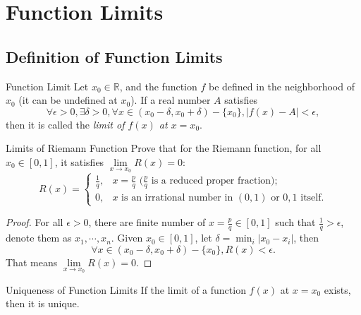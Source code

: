 
\section{Function Limits}

\subsection{Definition of Function Limits}

\begin{definition}{Function Limit}{}
  Let $x_0 \in \mathbb{R}$, and the function $f$ be defined in the neighborhood
  of $x_0$ (it can be undefined at $x_0$).
  If a real number $A$ satisfies
  \begin{equation}
    \forall \epsilon > 0, \exists \delta > 0, \forall x \in (x_0 - \delta, x_0 + \delta) - \{x_0\},
    |f(x) - A| < \epsilon,
  \end{equation}
  then it is called the \emph{limit of $f(x)$ at $x = x_0$}.
\end{definition}

\begin{example}{Limits of Riemann Function}{}
  Prove that for the Riemann function, for all $x_0 \in [0, 1]$,
  it satisfies $\lim \limits _{x \rightarrow x_0} R(x) = 0$:
  \begin{equation}
    R(x)= \begin{cases}
    \frac{1}{q}, & x = \frac{p}{q} \text{ ($\frac{p}{q}$ is a reduced proper fraction)}; \\
    0, & x \text{ is an irrational number in } (0,1) \text{ or } 0,1 \text{ itself}.
    \end{cases}
  \end{equation}
\end{example}

\begin{proof}
  For all $\epsilon > 0$, there are finite number of $x = \frac{p}{q} \in [0,
  1]$ such that $\frac{1}{q} > \epsilon$,
  denote them as $x_1,\cdots,x_n$.
  Given $x_0 \in [0, 1]$, let $\delta = \min_i |x_0 - x_i|$,
  then
  \begin{equation}
    \forall x \in (x_0 - \delta, x_0 + \delta) - \{x_0\},
    R(x) < \epsilon.
  \end{equation}
  That means $\lim \limits _{x \rightarrow x_0} R(x) = 0$.
\end{proof}

\begin{proposition}{Uniqueness of Function Limits}{}
  If the limit of a function $f(x)$ at $x = x_0$ exists, then it is unique.
\end{proposition}

